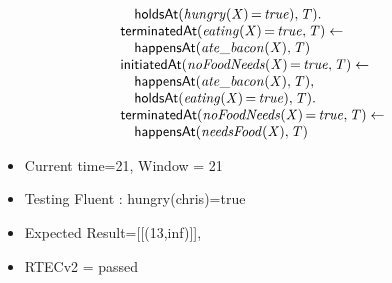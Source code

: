 \documentclass[8pt]{beamer}
\DeclareMathOperator{\val}{=}  %
\def \patsize {}
\def\happensAt{\textsf{\patsize happensAt}}
\def\holdsAt{\textsf{\patsize holdsAt}}
\def\initiatedAt{\textsf{\patsize initiatedAt}}
\def\terminatedAt{\textsf{\patsize terminatedAt}}
\newenvironment{mysplit}%
  {\arraycolsep 0pt \begin{array}{l}}%
  {\end{array}}
\begin{document}
\begin{frame}
\begin{minipage}{0.55\linewidth}
\begin{align*}
\begin{mysplit}
                \quad    \holdsAt\mathit{(hungry(X)\val true),T).}\\
                \terminatedAt\mathit{(eating(X)\val true,T)\leftarrow}\\
                \quad    \happensAt\mathit{(ate\_bacon(X),T)}\\
                \initiatedAt\mathit{(noFoodNeeds(X)\val true,T)\leftarrow}\\
                \quad    \happensAt\mathit{(ate\_bacon(X),T),}\\
                \quad    \holdsAt\mathit{(eating(X)\val true),T).}\\
                \terminatedAt\mathit{(noFoodNeeds(X)\val true,T)\leftarrow}\\
                \quad    \happensAt\mathit{(needsFood(X),T)}\\
            \end{mysplit}
        \end{align*}
    \end{minipage}
    \begin{itemize}
        \item Current time=21, Window = 21
        \item Testing Fluent :  hungry(chris)=true
        \item Expected Result=[[(13,inf)]],
        \item RTECv2 = passed
    \end{itemize}
\end{frame}
\end{document}
